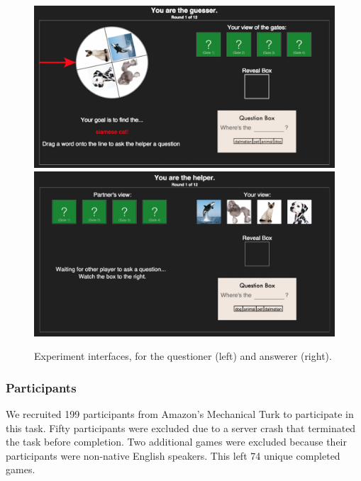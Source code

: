 \documentclass[12pt, floatsintext, jou]{apa6}
\begin{document}
\begin{figure}[t!]
\begin{center}
\includegraphics[scale = .213]{Exp4GuesserViewStart}
\includegraphics[scale = .105]{Exp4HelperViewStart}
\end{center}
\caption{Experiment interfaces, for the questioner (left) and answerer (right).}
\label{fig:expviews}
\end{figure}
\subsubsection{Participants} We recruited 199 participants from Amazon's Mechanical Turk to participate in this task. Fifty participants were excluded due to a server crash that terminated the task before completion. Two additional games were excluded because their participants were non-native English speakers. This left 74 unique completed games.
\end{document}
